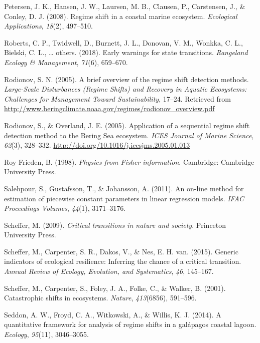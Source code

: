 \documentclass[12pt,twoside,openany]{reedthesis}
\begin{document}
\hypertarget{ref-petersen2008regime}{}
Petersen, J. K., Hansen, J. W., Laursen, M. B., Clausen, P., Carstensen,
J., \& Conley, D. J. (2008). Regime shift in a coastal marine ecosystem.
\emph{Ecological Applications}, \emph{18}(2), 497--510.

\hypertarget{ref-roberts2018early}{}
Roberts, C. P., Twidwell, D., Burnett, J. L., Donovan, V. M., Wonkka, C.
L., Bielski, C. L., \ldots{} others. (2018). Early warnings for state
transitions. \emph{Rangeland Ecology \& Management}, \emph{71}(6),
659--670.

\hypertarget{ref-rodionov_brief_2005}{}
Rodionov, S. N. (2005). A brief overview of the regime shift detection
methods. \emph{Large-Scale Disturbances (Regime Shifts) and Recovery in
Aquatic Ecosystems: Challenges for Management Toward Sustainability},
17--24. Retrieved from
\url{http://www.beringclimate.noaa.gov/regimes/rodionov_overview.pdf}

\hypertarget{ref-rodionov_application_2005}{}
Rodionov, S., \& Overland, J. E. (2005). Application of a sequential
regime shift detection method to the Bering Sea ecosystem. \emph{ICES
Journal of Marine Science}, \emph{62}(3), 328--332.
\url{http://doi.org/10.1016/j.icesjms.2005.01.013}

\hypertarget{ref-roy_frieden_physics_1998}{}
Roy Frieden, B. (1998). \emph{Physics from Fisher information}.
Cambridge: Cambridge University Press.

\hypertarget{ref-salehpour2011line}{}
Salehpour, S., Gustafsson, T., \& Johansson, A. (2011). An on-line
method for estimation of piecewise constant parameters in linear
regression models. \emph{IFAC Proceedings Volumes}, \emph{44}(1),
3171--3176.

\hypertarget{ref-scheffer_critical_2009}{}
Scheffer, M. (2009). \emph{Critical transitions in nature and society}.
Princeton University Press.

\hypertarget{ref-scheffer2015generic}{}
Scheffer, M., Carpenter, S. R., Dakos, V., \& Nes, E. H. van. (2015).
Generic indicators of ecological resilience: Inferring the chance of a
critical transition. \emph{Annual Review of Ecology, Evolution, and
Systematics}, \emph{46}, 145--167.

\hypertarget{ref-scheffer_catastrophic_2001}{}
Scheffer, M., Carpenter, S., Foley, J. A., Folke, C., \& Walker, B.
(2001). Catastrophic shifts in ecosystems. \emph{Nature},
\emph{413}(6856), 591--596.

\hypertarget{ref-seddon2014quantitative}{}
Seddon, A. W., Froyd, C. A., Witkowski, A., \& Willis, K. J. (2014). A
quantitative framework for analysis of regime shifts in a galápagos
coastal lagoon. \emph{Ecology}, \emph{95}(11), 3046--3055.
\end{document}
